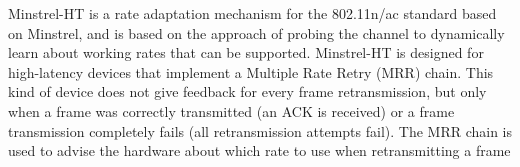 \begin{DoxyCompactList}
{Minstrel-\/\+HT is a rate adaptation mechanism for the 802.\+11n/ac standard based on Minstrel, and is based on the approach of probing the channel to dynamically learn about working rates that can be supported. Minstrel-\/\+HT is designed for high-\/latency devices that implement a Multiple Rate Retry (M\+RR) chain. This kind of device does not give feedback for every frame retransmission, but only when a frame was correctly transmitted (an A\+CK is received) or a frame transmission completely fails (all retransmission attempts fail). The M\+RR chain is used to advise the hardware about which rate to use when retransmitting a frame }{\pageref{dd/d09/classns3_1_1MinstrelHtWifiManager}}{}
\item{}
\item{}
\end{DoxyCompactList}
